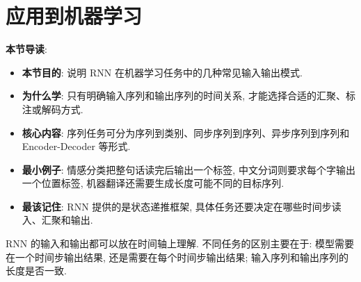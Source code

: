 \documentclass{../nndlcourse}
\begin{document}
\section{应用到机器学习}

\textbf{本节导读}:
\begin{itemize}
  \item \textbf{本节目的}: 说明 RNN 在机器学习任务中的几种常见输入输出模式.
  \item \textbf{为什么学}: 只有明确输入序列和输出序列的时间关系, 才能选择合适的汇聚、标注或解码方式.
  \item \textbf{核心内容}: 序列任务可分为序列到类别、同步序列到序列、异步序列到序列和 Encoder-Decoder 等形式.
  \item \textbf{最小例子}: 情感分类把整句话读完后输出一个标签, 中文分词则要求每个字输出一个位置标签, 机器翻译还需要生成长度可能不同的目标序列.
  \item \textbf{最该记住}: RNN 提供的是状态递推框架, 具体任务还要决定在哪些时间步读入、汇聚和输出.
\end{itemize}

RNN 的输入和输出都可以放在时间轴上理解. 不同任务的区别主要在于: 模型需要在一个时间步输出结果, 还是需要在每个时间步输出结果; 输入序列和输出序列的长度是否一致.
\end{document}
